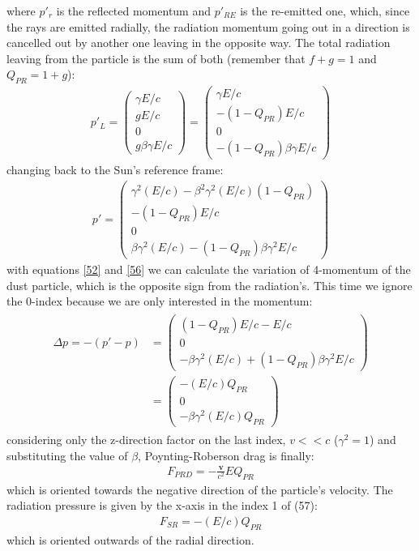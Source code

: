 \documentclass[12pt,a4paper]{article}
\begin{document}
where $p'_r$ is the reflected momentum and $p'_{RE}$ is the re-emitted one, which, since the rays are emitted radially, the radiation momentum going out in a direction is cancelled out by another one leaving in the opposite way. The total radiation leaving from the particle is the sum of both (remember that $f+g=1$ and $Q_{PR}=1+g$):
\begin{align}
    p'_L=
        \begin{pmatrix}
    \gamma E/c \\
    gE/c \\
    0 \\
    g\beta\gamma E/c
    \end{pmatrix}=
        \begin{pmatrix}
    \gamma E/c \\
    -(1-Q_{PR})E/c \\
    0 \\
    -(1-Q_{PR})\beta\gamma E/c
    \end{pmatrix}
\end{align}
changing back to the Sun's reference frame:
\begin{align}
\label{56}
p'=
    \begin{pmatrix}
    \gamma^2(E/c)-\beta^2\gamma^2(E/c)(1-Q_{PR}) \\
    -(1-Q_{PR})E/c \\
    0 \\
    \beta\gamma^2(E/c)-(1-Q_{PR})\beta\gamma^2 E/c
    \end{pmatrix}
\end{align}
with equations \eqref{52} and \eqref{56} we can calculate the variation of 4-momentum of the dust particle, which is the opposite sign from the radiation's. This time we ignore the 0-index because we are only interested in the momentum:
\begin{align}
\begin{split}
    \Delta p=-(p'-p)&=
    \begin{pmatrix}
    (1-Q_{PR})E/c-E/c \\
    0 \\
    -\beta\gamma^2(E/c)+(1-Q_{PR})\beta\gamma^2 E/c
    \end{pmatrix} \\
    &=\begin{pmatrix}
    -(E/c)Q_{PR} \\
    0 \\
    -\beta\gamma^2(E/c)Q_{PR}
    \end{pmatrix}
\end{split}
\end{align}
considering only the z-direction factor on the last index, $v<<c$ ($\gamma^2=1$) and substituting the value of $\beta$, Poynting-Roberson drag is finally:
\begin{align}
    F_{PRD}=-\frac{\textbf{v}}{c^2}EQ_{PR}
\end{align}
which is oriented towards the negative direction of the particle's velocity. The radiation pressure is given by the x-axis in the index 1 of (57):
\begin{align}
    F_{SR}=-(E/c)Q_{PR}
\end{align}
which is oriented outwards of the radial direction. 
\end{document}
